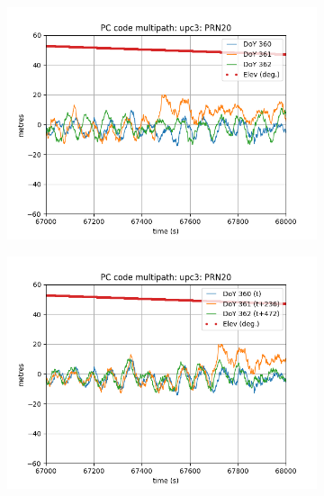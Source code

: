 \begin{figure}[H]
    \centering
    \begin{subfigure}{0.45\textwidth}
        \centering
        \includegraphics[scale=0.52]{sources/Figures/FIG_2/TUT2_Ex4.1a.png}
        \caption{}
        \label{fig:subfig1}
    \end{subfigure}
    \hfill
    \begin{subfigure}{0.45\textwidth}
        \centering
        \includegraphics[scale=0.52]{sources/Figures/FIG_2/TUT2_Ex4.1b.png}
        \caption{}
        \label{fig:subfig2}
    \end{subfigure}
    \caption{}
    \label{fig:dos-figuras-juntas}
\end{figure}


